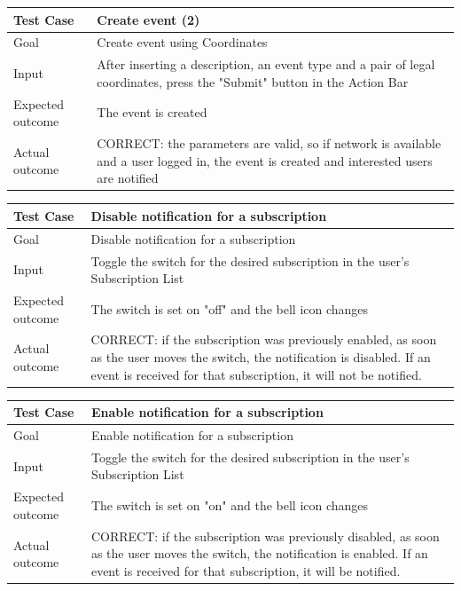 \documentclass[a4paper]{scrreprt}
\begin{document}
\begin{tabularx}{\linewidth}{|l|X|}
	\hline
	\textbf{Test Case} 	& \textbf{Create event (2)} \\ \hline
	Goal 				& Create event using Coordinates \\ \hline
	Input 				& After inserting a description, an event type and a pair of legal coordinates, press the "Submit" button in the Action Bar \\ \hline
	Expected outcome 	& The event is created \\ \hline
	Actual outcome 		& CORRECT: the parameters are valid, so if network is available and a user logged in, the event is created and interested users are notified \\ \hline
\end{tabularx}
\bigskip
\noindent
\begin{tabularx}{\linewidth}{|l|X|}
	\hline
	\textbf{Test Case} 	& \textbf{Disable notification for a subscription} \\ \hline
	Goal 				& Disable notification for a subscription \\ \hline
	Input 				& Toggle the switch for the desired subscription in the user's Subscription List \\ \hline
	Expected outcome 	& The switch is set on "off" and the bell icon changes  \\ \hline
	Actual outcome 		& CORRECT: if the subscription was previously enabled, as soon as the user moves the switch, the notification is disabled. If an event is received for that subscription, it will not be notified. \\ \hline
\end{tabularx}
\bigskip
\noindent
\begin{tabularx}{\linewidth}{|l|X|}
	\hline
	\textbf{Test Case} 	& \textbf{Enable notification for a subscription} \\ \hline
	Goal 				& Enable notification for a subscription \\ \hline
	Input 				& Toggle the switch for the desired subscription in the user's Subscription List \\ \hline
	Expected outcome 	& The switch is set on "on" and the bell icon changes \\ \hline
	Actual outcome 		& CORRECT: if the subscription was previously disabled, as soon as the user moves the switch, the notification is enabled. If an event is received for that subscription, it will be notified. \\ \hline
\end{tabularx}
\end{document}
